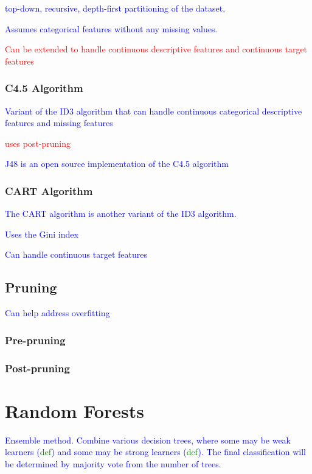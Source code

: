 \textcolor{blue}{top-down, recursive, depth-first partitioning of the dataset.}

\textcolor{blue}{Assumes categorical features without any missing values.}

\textcolor{red}{Can be extended to handle continuous descriptive features and continuous target features}

\subsubsection{C4.5 Algorithm}

\textcolor{blue}{Variant of the {ID3 algorithm} that can handle continuous categorical descriptive features and missing features}

\textcolor{red}{uses post-pruning}

\textcolor{blue}{{J48} is an open source implementation of the C4.5 algorithm}

\subsubsection{CART Algorithm}

\textcolor{blue}{The CART algorithm is another variant of the ID3 algorithm.}

\textcolor{blue}{Uses the Gini index}

\textcolor{blue}{Can handle continuous target features}

\subsection{Pruning}

\textcolor{blue}{Can help address overfitting}

\subsubsection{Pre-pruning}

\subsubsection{Post-pruning}

\section{Random Forests}

\textcolor{blue}{Ensemble method. Combine various decision trees, where some may be weak learners (\textcolor{green}{def}) and some may be strong learners (\textcolor{green}{def}). The final classification will be determined by majority vote from the number of trees.}